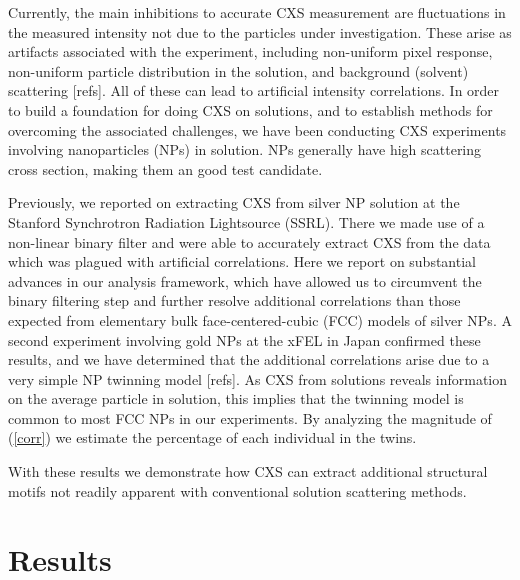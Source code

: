 \documentclass [11pt,fleqn]{article}
\def \be {\begin{equation}}
\def \ee {\end{equation}}
\begin{document}
Currently, the main inhibitions to accurate CXS measurement are fluctuations in the measured intensity not due to the particles under investigation. These arise as artifacts associated with the experiment, including non-uniform pixel response, non-uniform particle distribution in the solution, and background (solvent) scattering [refs]. All of these can lead to artificial intensity correlations. In order to build a foundation for doing CXS on solutions, and to establish methods for overcoming the associated challenges, we have been conducting CXS experiments involving nanoparticles (NPs) in solution. NPs generally have high scattering cross section, making them an good test candidate.

Previously, we reported on extracting CXS from silver NP solution at the Stanford Synchrotron Radiation Lightsource (SSRL). There we made use of a non-linear binary filter and were able to accurately extract CXS from the data which was plagued with artificial correlations. Here we report on substantial advances in our analysis framework, which have allowed us to circumvent the binary filtering step and further resolve additional correlations than those expected from elementary bulk face-centered-cubic (FCC) models of silver NPs. A second experiment involving gold NPs at the xFEL in Japan  confirmed these results, and we have determined that the additional correlations arise due to a very simple NP twinning model [refs]. As CXS from solutions reveals information on the average particle in solution, this implies that the twinning model is common to most FCC NPs in our experiments. By analyzing the magnitude of (\ref{corr}) we estimate the percentage of each individual in the twins.

With these results we demonstrate how CXS can extract additional structural motifs not readily apparent with conventional solution scattering methods.
 


\section{Results}





\end{document}
